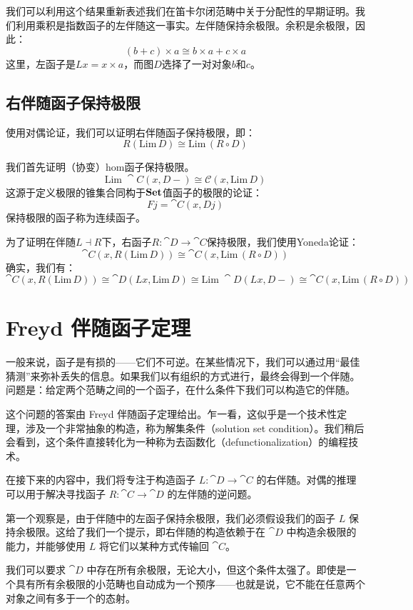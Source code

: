 \documentclass[DaoFP]{subfiles}
\begin{document}
我们可以利用这个结果重新表述我们在笛卡尔闭范畴中关于分配性的早期证明。我们利用乘积是指数函子的左伴随这一事实。左伴随保持余极限。余积是余极限，因此：
\[(b + c) \times a \cong b \times a + c \times a \]
这里，左函子是$L x = x \times a$，而图$D$选择了一对对象$b$和$c$。

\subsection{右伴随函子保持极限}
使用对偶论证，我们可以证明右伴随函子保持极限，即：
\[ R (\text{Lim}\, D) \cong \text{Lim}\, (R \circ D) \]

我们首先证明（协变）hom函子保持极限。
\[ \text{Lim}\; \cat C( x, D-) \cong \mathcal{C}(x, \text{Lim}\,D) \]
这源于定义极限的锥集合同构于$\mathbf{Set}$值函子的极限的论证：
\[ F j = \cat C(x, D j) \]
保持极限的函子称为连续函子。

为了证明在伴随$L \dashv R$下，右函子$R \colon \cat D \to \cat C$保持极限，我们使用Yoneda论证：
\[ \cat C(x, R (\text{Lim}\, D)) \cong \cat C (x, \text{Lim}\, (R \circ D)) \]
确实，我们有：
\[ \cat C(x, R (\text{Lim}\, D)) \cong \cat D(L x, \text{Lim}\, D) \cong \text{Lim}\; \cat D(L x, D-) \cong \cat C(x, \text{Lim}\, (R \circ D))\]


\section{Freyd 伴随函子定理}

一般来说，函子是有损的——它们不可逆。在某些情况下，我们可以通过用“最佳猜测”来弥补丢失的信息。如果我们以有组织的方式进行，最终会得到一个伴随。问题是：给定两个范畴之间的一个函子，在什么条件下我们可以构造它的伴随。

这个问题的答案由 Freyd 伴随函子定理给出。乍一看，这似乎是一个技术性定理，涉及一个非常抽象的构造，称为解集条件（solution set condition）。我们稍后会看到，这个条件直接转化为一种称为去函数化（defunctionalization）的编程技术。

在接下来的内容中，我们将专注于构造函子 $L \colon \cat D \to \cat C$ 的右伴随。对偶的推理可以用于解决寻找函子 $R \colon \cat C \to \cat D$ 的左伴随的逆问题。

第一个观察是，由于伴随中的左函子保持余极限，我们必须假设我们的函子 $L$ 保持余极限。这给了我们一个提示，即右伴随的构造依赖于在 $\cat D$ 中构造余极限的能力，并能够使用 $L$ 将它们以某种方式传输回 $\cat C$。

我们可以要求 $\cat D$ 中存在所有余极限，无论大小，但这个条件太强了。即使是一个具有所有余极限的小范畴也自动成为一个预序——也就是说，它不能在任意两个对象之间有多于一个的态射。
\end{document}

